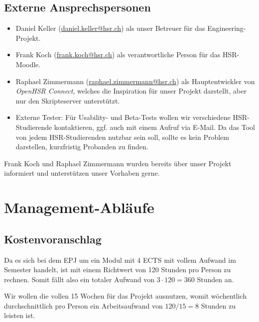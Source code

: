 \documentclass[a4paper]{article}
\let\oldsection\section
\renewcommand\section{\clearpage\oldsection}
\begin{document}
\subsection{Externe Ansprechspersonen}


\begin{itemize}
  \item Daniel Keller (\url{daniel.keller@hsr.ch}) als unser Betreuer für das Engineering-Projekt.
  \item Frank Koch (\url{frank.koch@hsr.ch}) als verantwortliche Person für das HSR-Moodle.
  \item Raphael Zimmermann (\url{raphael.zimmermann@hsr.ch}) als Hauptentwickler
    von \emph{OpenHSR Connect}, welches die
    Inspiration für unser Projekt darstellt, aber nur den Skripteserver
    unterstützt.
  \item Externe Tester: Für Usability- und Beta-Tests wollen wir verschiedene
    HSR-Studierende kontaktieren, ggf. auch mit einem Aufruf via E-Mail. Da das Tool von jedem HSR-Studierenden nutzbar sein soll, sollte es kein Problem darstellen, kurzfristig Probanden zu finden.
\end{itemize}

Frank Koch und Raphael Zimmermann wurden bereits über unser Projekt informiert
und unterstützen unser Vorhaben gerne.

\section{Management-Abläufe}
\subsection{Kostenvoranschlag}

Da es sich bei dem EPJ um ein Modul mit 4 ECTS mit vollem Aufwand im Semester handelt, ist mit einem Richtwert von 120 Stunden pro Person zu rechnen. Somit fällt also ein totaler Aufwand von $3 \cdot 120 = 360$ Stunden an.

Wir wollen die vollen 15 Wochen für das Projekt ausnutzen, womit wöchentlich
durchschnittlich pro Person ein Arbeitsaufwand von $120 / 15 = 8$ Stunden zu
leisten ist. \\[3em]
\end{document}
